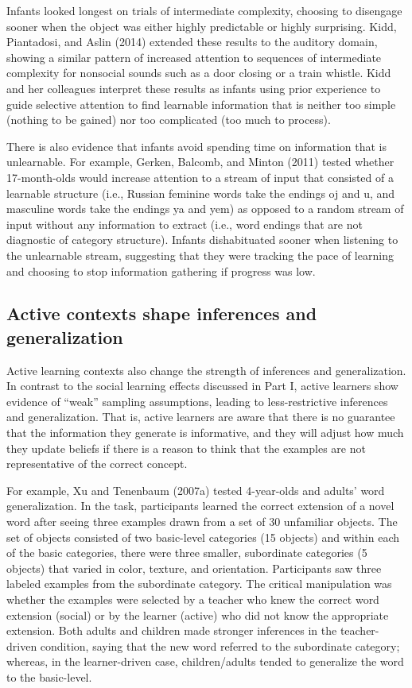 \documentclass[english,floatsintext,man]{apa6}
\theoremstyle{definition}
\theoremstyle{definition}
\theoremstyle{definition}
\theoremstyle{remark}
\begin{document}
Infants looked longest on trials of intermediate complexity, choosing to
disengage sooner when the object was either highly predictable or highly
surprising. Kidd, Piantadosi, and Aslin (2014) extended these results to
the auditory domain, showing a similar pattern of increased attention to
sequences of intermediate complexity for nonsocial sounds such as a door
closing or a train whistle. Kidd and her colleagues interpret these
results as infants using prior experience to guide selective attention
to find learnable information that is neither too simple (nothing to be
gained) nor too complicated (too much to process).

There is also evidence that infants avoid spending time on information
that is unlearnable. For example, Gerken, Balcomb, and Minton (2011)
tested whether 17-month-olds would increase attention to a stream of
input that consisted of a learnable structure (i.e., Russian feminine
words take the endings oj and u, and masculine words take the endings ya
and yem) as opposed to a random stream of input without any information
to extract (i.e., word endings that are not diagnostic of category
structure). Infants dishabituated sooner when listening to the
unlearnable stream, suggesting that they were tracking the pace of
learning and choosing to stop information gathering if progress was low.

\subsection{Active contexts shape inferences and
generalization}\label{active-contexts-shape-inferences-and-generalization}

Active learning contexts also change the strength of inferences and
generalization. In contrast to the social learning effects discussed in
Part I, active learners show evidence of \enquote{weak} sampling
assumptions, leading to less-restrictive inferences and generalization.
That is, active learners are aware that there is no guarantee that the
information they generate is informative, and they will adjust how much
they update beliefs if there is a reason to think that the examples are
not representative of the correct concept.

For example, Xu and Tenenbaum (2007a) tested 4-year-olds and adults'
word generalization. In the task, participants learned the correct
extension of a novel word after seeing three examples drawn from a set
of 30 unfamiliar objects. The set of objects consisted of two
basic-level categories (15 objects) and within each of the basic
categories, there were three smaller, subordinate categories (5 objects)
that varied in color, texture, and orientation. Participants saw three
labeled examples from the subordinate category. The critical
manipulation was whether the examples were selected by a teacher who
knew the correct word extension (social) or by the learner (active) who
did not know the appropriate extension. Both adults and children made
stronger inferences in the teacher-driven condition, saying that the new
word referred to the subordinate category; whereas, in the
learner-driven case, children/adults tended to generalize the word to
the basic-level.
\end{document}
